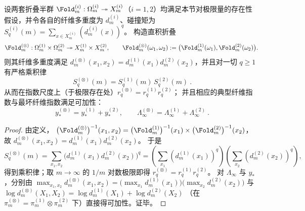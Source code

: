 \begin{proposition}\label{prop:pom-product-fold-additivity}
设两套折叠半群 \(\Fold_m^{(i)}:\Omega_m^{(i)}\twoheadrightarrow X_m^{(i)}\)（\(i=1,2\)）均满足本节对极限量的存在性假设，并令各自的纤维多重度为 \(d_m^{(i)}\)、碰撞矩为 \(S_q^{(i)}(m)=\sum_{x\in X_m^{(i)}}(d_m^{(i)}(x))^q\)。
构造直积折叠
\[
\Fold_m^{(\otimes)}:\Omega_m^{(1)}\times\Omega_m^{(2)}\twoheadrightarrow X_m^{(1)}\times X_m^{(2)},
\qquad
\Fold_m^{(\otimes)}(\omega_1,\omega_2):=\bigl(\Fold_m^{(1)}(\omega_1),\Fold_m^{(2)}(\omega_2)\bigr).
\]
则其纤维多重度满足 \(d_m^{(\otimes)}(x_1,x_2)=d_m^{(1)}(x_1)d_m^{(2)}(x_2)\)，并且对一切 \(q\ge 1\) 有严格乘积律
\[
\boxed{\ S_q^{(\otimes)}(m)=S_q^{(1)}(m)\,S_q^{(2)}(m)\ }.
\]
从而在指数尺度上（于极限存在处）\(r_q^{(\otimes)}=r_q^{(1)}r_q^{(2)}\)；
并且相应的典型纤维指数与最坏纤维指数满足可加性：
\[
\boxed{\ y_\ast^{(\otimes)}=y_\ast^{(1)}+y_\ast^{(2)},\qquad \Lambda_\infty^{(\otimes)}=\Lambda_\infty^{(1)}+\Lambda_\infty^{(2)}\ }.
\]
\end{proposition}
\begin{proof}
由定义，
\(
\bigl(\Fold_m^{(\otimes)}\bigr)^{-1}(x_1,x_2)=\bigl(\Fold_m^{(1)}\bigr)^{-1}(x_1)\times \bigl(\Fold_m^{(2)}\bigr)^{-1}(x_2)
\)，
故 \(d_m^{(\otimes)}(x_1,x_2)=d_m^{(1)}(x_1)d_m^{(2)}(x_2)\)。
于是
\[
S_q^{(\otimes)}(m)
=\sum_{x_1,x_2}\bigl(d_m^{(1)}(x_1)d_m^{(2)}(x_2)\bigr)^q
=\left(\sum_{x_1}(d_m^{(1)}(x_1))^q\right)\left(\sum_{x_2}(d_m^{(2)}(x_2))^q\right),
\]
得到乘积律；取 \(m\to\infty\) 的 \(1/m\) 对数极限即得 \(r_q^{(\otimes)}=r_q^{(1)}r_q^{(2)}\)。
对 \(\Lambda_\infty\) 与 \(y_\ast\)，分别由
\(
\max_{x_1,x_2}d_m^{(\otimes)}(x_1,x_2)=\bigl(\max_{x_1}d_m^{(1)}(x_1)\bigr)\bigl(\max_{x_2}d_m^{(2)}(x_2)\bigr)
\)
与
\(
\log d_m^{(\otimes)}(X_1,X_2)=\log d_m^{(1)}(X_1)+\log d_m^{(2)}(X_2)
\)
（在 \(\pi_m^{(\otimes)}=\pi_m^{(1)}\otimes\pi_m^{(2)}\) 下）直接得可加性。证毕。
\end{proof}

